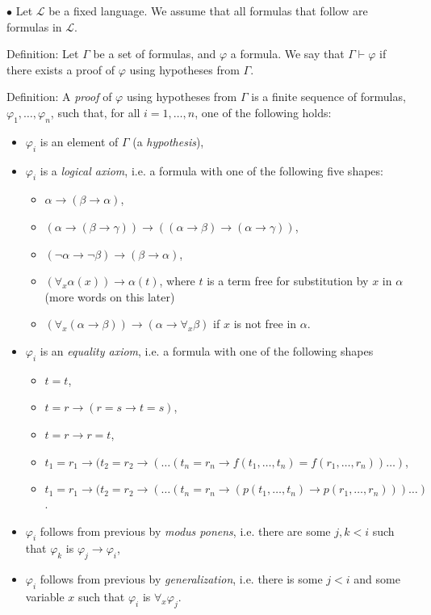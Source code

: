 \documentclass{article}
\newcommand{\Lang}{\mathcal{L}}
\newcommand\point[1]{\noindent \hspace{\labelsep} $\bullet$ #1 \smallskip}
\begin{document}
\point{Let $\Lang$ be a fixed language. We assume that all formulas that follow are formulas in $\Lang$.

Definition: Let $\Gamma$ be a set of formulas, and $\varphi$ a formula. We say that $\Gamma \vdash \varphi$ if there exists a proof of $\varphi$ using hypotheses from $\Gamma$.

Definition: A \emph{proof} of $\varphi$ using hypotheses from $\Gamma$ is a finite sequence of formulas, $\varphi_1, \dots, \varphi_n$, such that, for all $i = 1, \dots, n$, one of the following holds:
\begin{itemize}
\item $\varphi_i$ is an element of $\Gamma$ (a \emph{hypothesis}),
\item $\varphi_i$ is a \emph{logical axiom}, i.e. a formula with one of the following five shapes:
\begin{itemize}
\item $\alpha \rightarrow (\beta \rightarrow \alpha)$,
\item $(\alpha \rightarrow (\beta \rightarrow \gamma)) \rightarrow ( (\alpha \rightarrow \beta) \rightarrow (\alpha \rightarrow \gamma))$,
\item $(\neg \alpha \rightarrow \neg \beta) \rightarrow (\beta \rightarrow \alpha)$,
\item $(\forall_x \alpha(x)) \rightarrow \alpha(t)$, where $t$ is a term free for substitution by $x$ in $\alpha$ (more words on this later)
\item $(\forall_x (\alpha \rightarrow \beta)) \rightarrow (\alpha \rightarrow \forall_x \beta)$ if $x$ is not free in $\alpha$.
\end{itemize}
\item $\varphi_i$ is an \emph{equality axiom}, i.e. a formula with one of the following shapes
\begin{itemize}
\item $t = t$,
\item $t = r \rightarrow (r = s \rightarrow t = s)$,
\item $t = r \rightarrow r = t$,
\item $t_1 = r_1 \rightarrow (t_2 = r_2 \rightarrow ( \dots (t_n = r_n \rightarrow f(t_1, \dots, t_n) = f(r_1, \dots, r_n)) \dots )$,
\item $t_1 = r_1 \rightarrow (t_2 = r_2 \rightarrow ( \dots (t_n = r_n \rightarrow (p(t_1, \dots, t_n) \rightarrow p(r_1, \dots, r_n))) \dots )$.
\end{itemize}
\item $\varphi_i$ follows from previous by \emph{modus ponens}, i.e. there are some $j, k < i$ such that $\varphi_k$ is $\varphi_j \rightarrow \varphi_i$,
\item $\varphi_i$ follows from previous by \emph{generalization}, i.e. there is some $j < i$ and some variable $x$ such that $\varphi_i$ is $\forall_x \varphi_j$.
\end{itemize}}
\end{document}
